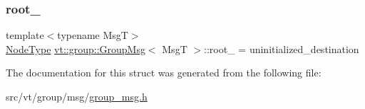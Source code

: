 \subsubsection{\texorpdfstring{root\+\_\+}{root\_}}
{\footnotesize\ttfamily template$<$typename MsgT$>$ \\
\hyperlink{namespacevt_a866da9d0efc19c0a1ce79e9e492f47e2}{Node\+Type} \hyperlink{structvt_1_1group_1_1_group_msg}{vt\+::group\+::\+Group\+Msg}$<$ MsgT $>$\+::root\+\_\+ = uninitialized\+\_\+destination\hspace{0.3cm}{\ttfamily [protected]}}



The documentation for this struct was generated from the following file\+:\begin{DoxyCompactItemize}
\item 
src/vt/group/msg/\hyperlink{group__msg_8h}{group\+\_\+msg.\+h}\end{DoxyCompactItemize}
